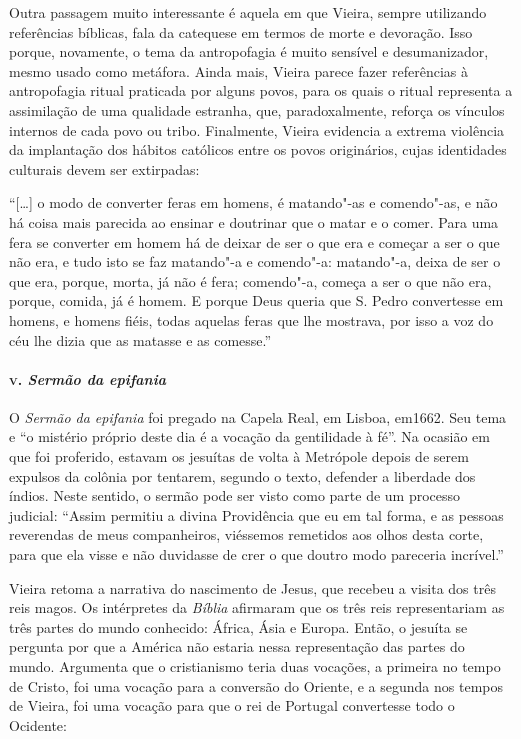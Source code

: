 Outra passagem muito interessante é aquela em que Vieira, sempre
utilizando referências bíblicas, fala da catequese em termos de morte e
devoração. Isso porque, novamente, o tema da antropofagia é muito
sensível e desumanizador, mesmo usado como metáfora. Ainda mais, Vieira
parece fazer referências à antropofagia ritual praticada por alguns
povos, para os quais o ritual representa a assimilação de uma qualidade
estranha, que, paradoxalmente, reforça os vínculos internos de cada povo
ou tribo. Finalmente, Vieira evidencia a extrema violência da
implantação dos hábitos católicos entre os povos originários, cujas
identidades culturais devem ser extirpadas:

``{[}\ldots{}{]} o modo de converter feras em homens, é matando"-as e
comendo"-as, e não há coisa mais parecida ao ensinar e doutrinar que o
matar e o comer. Para uma fera se converter em homem há de deixar de ser
o que era e começar a ser o que não era, e tudo isto se faz matando"-a e
comendo"-a: matando"-a, deixa de ser o que era, porque, morta, já não é
fera; comendo"-a, começa a ser o que não era, porque, comida, já é homem.
E porque Deus queria que S. Pedro convertesse em homens, e homens fiéis,
todas aquelas feras que lhe mostrava, por isso a voz do céu lhe dizia
que as matasse e as comesse.''

\paragraph{\textsc{v}. \emph{Sermão da epifania}}

O \emph{Sermão da epifania} foi pregado na Capela Real, em Lisboa,
em1662. Seu tema e ``o mistério próprio deste dia é a vocação da
gentilidade à fé''. Na ocasião em que foi proferido, estavam os jesuítas
de volta à Metrópole depois de serem expulsos da colônia por tentarem,
segundo o texto, defender a liberdade dos índios. Neste sentido, o
sermão pode ser visto como parte de um processo judicial: ``Assim
permitiu a divina Providência que eu em tal forma, e as pessoas
reverendas de meus companheiros, viéssemos remetidos aos olhos desta
corte, para que ela visse e não duvidasse de crer o que doutro modo
pareceria incrível.''

Vieira retoma a narrativa do nascimento de Jesus, que recebeu a visita
dos três reis magos. Os intérpretes da \emph{Bíblia} afirmaram que os
três reis representariam as três partes do mundo conhecido: África, Ásia
e Europa. Então, o jesuíta se pergunta por que a América não estaria
nessa representação das partes do mundo. Argumenta que o cristianismo
teria duas vocações, a primeira no tempo de Cristo, foi uma vocação para
a conversão do Oriente, e a segunda nos tempos de Vieira, foi uma
vocação para que o rei de Portugal convertesse todo o Ocidente:

